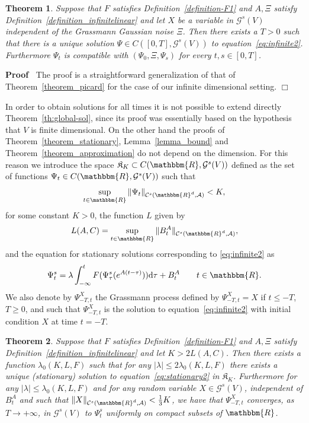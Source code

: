 \documentclass[11pt]{article}
\newcommand{\mathd}{\mathrm{d}}
\newenvironment{proof}{\noindent\textbf{Proof\ }}{\hspace*{\fill}$\Box$\medskip}
\newtheorem{theorem}{Theorem}
\begin{document}
\begin{theorem}
  \label{theorem_existence2}Suppose that $F$ satisfies
  Definition~\ref{definition-F1} and $A, \Xi$ satisfy
  Definition~\ref{definition_infinitelinear} and let $X$ be a variable in
  $\mathcal{G}^s (V)$ independent of the Grassmann Gaussian noise $\Xi$. Then
  there exists a $T > 0$ such that there is a unique solution $\Psi \in C ([0,
  T], \mathcal{G}^s (V))$ to equation~{\eqref{eq:infinite2}}. Furthermore
  $\Psi_t$ is compatible with $(\Psi_0, \Xi, \Psi_s)$ for every $t, s \in [0,
  T]$.
\end{theorem}

\begin{proof}
  The proof is a straightforward generalization of that of
  Theorem~\ref{theorem_picard} for the case of our infinite dimensional
  setting.
\end{proof}

In order to obtain solutions for all times it is not possible to extend
directly Theorem~\ref{th:global-sol}, since its proof was essentially based on
the hypothesis that $V$ is finite dimensional. On the other hand the proofs of
Theorem~\ref{theorem_stationary}, Lemma~\ref{lemma_bound} and
Theorem~\ref{theorem_approximation} do not depend on the dimension. For this
reason we introduce the space $\mathfrak{K}_K \subset C (\mathbbm{R},
\mathcal{G}^s (V))$ defined as the set of functions $\Psi_t \in C (\mathbbm{R},
\mathcal{G}^s (V))$ such that
\[ \sup_{t \in \mathbbm{R}} \| \Psi_t \|_{\mathcal{C}^s (\mathbbm{R}^d,
   \mathcal{A})} < K, \]
for some constant $K > 0$, the function $L$ given by
\[ L (A, C) = \sup_{t \in \mathbbm{R}} \| B^A_t \|_{\mathcal{C}^s
   (\mathbbm{R}^d, \mathcal{A})}, \]
and the equation for stationary solutions corresponding to
{\eqref{eq:infinite2}} as
\begin{equation}
  \Psi_t^s = \lambda \int_{- \infty}^t F (\Psi_{\tau}^s (e^{A (t - \tau)}))
  \mathd \tau + B^A_t \label{eq:stationary2} \qquad t \in \mathbbm{R}.
\end{equation}
We also denote by $\Psi_{- T, t}^X$ the Grassmann process defined by $\Psi_{-
T, t}^X = X$ if $t \leqslant - T$, $T \geqslant 0$, and such that $\Psi_{- T,
t}^X$ is the solution to equation~{\eqref{eq:infinite2}} with initial
condition $X$ at time $t = - T$. \

\begin{theorem}
  \label{theorem_longtime2}Suppose that $F$ satisfies
  Definition~\ref{definition-F1} and $A, \Xi$ satisfy
  Definition~\ref{definition_infinitelinear} and let $K > 2 L (A, C)$. Then
  there exists a function $\lambda_0 (K, L, F)$ such that for any $| \lambda |
  \leqslant 2 \lambda_0 (K, L, F)$ there exists a unique (stationary) solution
  to equation~{\eqref{eq:stationary2}} in $\mathfrak{K}_K$. Furthermore for
  any $| \lambda | \leqslant \lambda_0 (K, L, F)$ and for any random variable
  $X \in \mathcal{G}^s_{\mathcal{}} (V)$, independent of $B^A_t$ and such that
  $\| X \|_{\mathcal{C}^s (\mathbbm{R}^d, \mathcal{A})} < \frac{1}{3} K$, we
  have that $\Psi^X_{- T, t}$ converges, as $T \rightarrow + \infty$, in
  $\mathcal{G}^s (V)$ to $\Psi^s_t$ uniformly on compact subsets of
  $\mathbbm{R}$.
\end{theorem}
\end{document}
